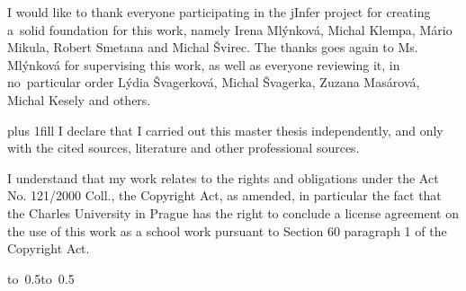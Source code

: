 \documentclass[a4paper,12pt,oneside]{report}
\theoremstyle{definition}
\let\openright=\clearpage
\begin{document}
\newpage %
\openright

\noindent
I would like to thank everyone participating in the jInfer project for creating a~solid foundation for this work, namely Irena Mlýn\-ko\-vá, Mi\-chal Klem\-pa, Má\-rio Mi\-ku\-la, Ro\-bert Sme\-ta\-na and Mi\-chal Švi\-rec. The thanks goes again to Ms. Mlýn\-ko\-vá for supervising this work, as well as everyone reviewing it, in no~particular order Lý\-dia Šva\-ger\-ko\-vá, Mi\-chal Šva\-ger\-ka, Zu\-za\-na Ma\-sá\-ro\-vá, Mi\-chal Ke\-se\-ly and others.

\newpage %
\vglue 0pt plus 1fill
\noindent
I declare that I carried out this master thesis independently, and only with the cited
sources, literature and other professional sources.

\medskip\noindent
I understand that my work relates to the rights and obligations under the Act No.
121/2000 Coll., the Copyright Act, as amended, in particular the fact that the Charles
University in Prague has the right to conclude a license agreement on the use of this
work as a school work pursuant to Section 60 paragraph 1 of the Copyright Act.

\vspace{10mm}

\hbox{\hbox to 0.5\hbox to 0.5}

\vspace{20mm}
\end{document}
